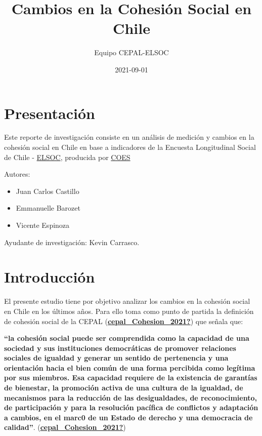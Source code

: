 \documentclass[
  12pt,
]{book}
\title{Cambios en la Cohesión Social en Chile}
\author{Equipo CEPAL-ELSOC}
\date{2021-09-01}
\providecommand{\tightlist}{%
  \setlength{\itemsep}{0pt}\setlength{\parskip}{0pt}}
\begin{document}
\maketitle

{
\hypersetup{linkcolor=}
\setcounter{tocdepth}{1}
\tableofcontents
}
\listoffigures
\listoftables
{}
\hypertarget{presentaciuxf3n}{%
\chapter*{Presentación}\label{presentaciuxf3n}}

Este reporte de investigación consiste en un análisis de medición y cambios en la cohesión social en Chile en base a indicadores de la Encuesta Longitudinal Social de Chile - \href{https://coes.cl/encuesta-panel/}{ELSOC}, producida por \href{https://coes.cl/}{COES}

Autores:

\begin{itemize}
\tightlist
\item
  Juan Carlos Castillo
\item
  Emmanuelle Barozet
\item
  Vicente Espinoza
\end{itemize}

Ayudante de investigación: Kevin Carrasco.

\hypertarget{introducciuxf3n}{%
\chapter*{Introducción}\label{introducciuxf3n}}

El presente estudio tiene por objetivo analizar los cambios en la cohesión social en Chile en los últimos años. Para ello toma como punto de partida la definición de cohesión social de la CEPAL (\protect\hyperlink{ref-cepal_Cohesion_2021}{\textbf{cepal\_Cohesion\_2021?}}) que señala que:

\textbf{``la cohesión social puede ser comprendida como la capacidad de una sociedad y sus instituciones democráticas de promover relaciones sociales de igualdad y generar un sentido de pertenencia y una orientación hacia el bien común de una forma percibida como legítima por sus miembros. Esa capacidad requiere de la existencia de garantías de bienestar, la promoción activa de una cultura de la igualdad, de mecanismos para la reducción de las desigualdades, de reconocimiento, de participación y para la resolución pacífica de conflictos y adaptación a cambios, en el marc0 de un Estado de derecho y una democracia de calidad''}. (\protect\hyperlink{ref-cepal_Cohesion_2021}{\textbf{cepal\_Cohesion\_2021?}})
\end{document}
